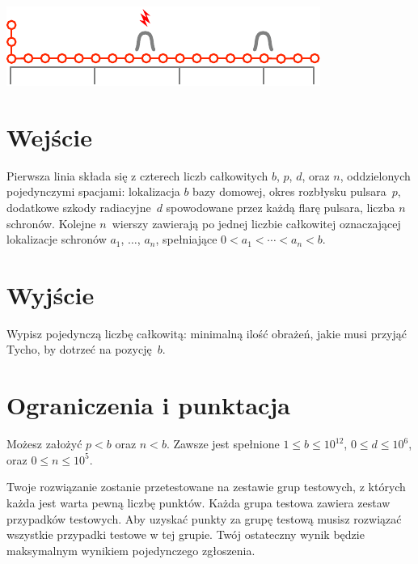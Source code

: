 \includegraphics[width=.4\textwidth]{img/sample3.pdf}

\section*{Wejście}

Pierwsza linia składa się z czterech liczb całkowitych $b$, $p$, $d$, oraz $n$, oddzielonych pojedynczymi spacjami:
lokalizacja $b$ bazy domowej,
okres rozbłysku pulsara~$p$,
dodatkowe szkody radiacyjne~$d$ spowodowane przez każdą flarę pulsara,
liczba $n$ schronów.
Kolejne $n$~wierszy zawierają po jednej liczbie całkowitej oznaczającej lokalizacje schronów $a_1$, $\ldots$, $a_n$, spełniające
$0<a_1<\cdots <a_n< b$. %

\section*{Wyjście}

Wypisz pojedynczą liczbę całkowitą: minimalną ilość obrażeń, jakie musi przyjąć Tycho, by dotrzeć na pozycję~$b$.

\section*{Ograniczenia i punktacja}

Możesz założyć
$p < b$ %
oraz
$n < b$. %
Zawsze jest spełnione
$1\leq b\leq 10^{12}$, %
$0\leq d \leq 10^6$, %
oraz
$0\leq n \leq 10^5$. %

Twoje rozwiązanie zostanie przetestowane na zestawie grup testowych, z których każda jest warta pewną liczbę punktów.
Każda grupa testowa zawiera zestaw przypadków testowych.
Aby uzyskać punkty za grupę testową musisz rozwiązać wszystkie przypadki testowe w tej grupie.
Twój ostateczny wynik będzie maksymalnym wynikiem pojedynczego zgłoszenia.

